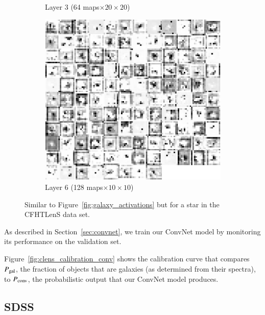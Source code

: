 \documentclass[fleqn,usenatbib]{mnras}
\begin{document}
\begin{figure}
\begin{subfigure}[c]{0.24\linewidth}
    \caption{Layer 3 (64 maps$\times20\times20$)}
  \end{subfigure}
  \hfill
  \begin{subfigure}[c]{0.24\linewidth}
  \centering
    \includegraphics[width=\textwidth]{figures/star_conv31.pdf}
    \caption{Layer 6 (128 maps$\times10\times10$)}
  \end{subfigure}
  \caption{
    Similar to Figure~\ref{fig:galaxy_activations} but for a star in the
    CFHTLenS data set.
    }
  \label{fig:star_activations}
\end{figure}

As described in Section~\ref{sec:convnet},
we train our ConvNet model by monitoring its performance on the validation set.

Figure~\ref{fig:clens_calibration_conv} shows the calibration curve
that compares $P_{{\mathrm{gal}}}$,
the fraction of objects that are galaxies (as determined from their spectra),
to $P_{{\mathrm{conv}}}$, the probabilistic output that our ConvNet model produces.


\subsection{SDSS}
  \label{sec:results_sdss}
\end{document}
